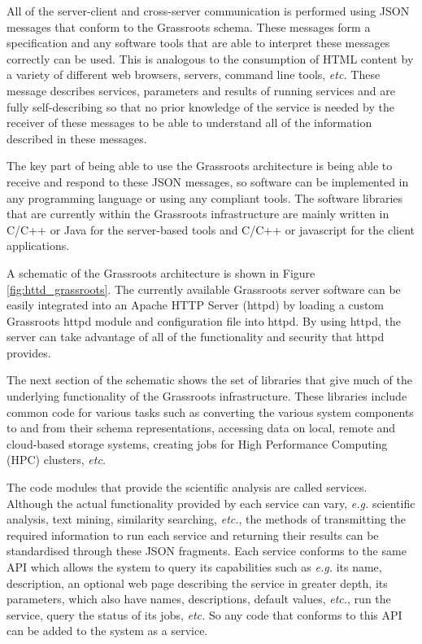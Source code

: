\documentclass[9pt,a4paper]{extarticle}
\begin{document}
All of the server-client and cross-server communication is performed using JSON\cite{JSON} messages that conform to the Grassroots schema. 
These messages form a specification and any software tools that are able to interpret these messages correctly can be used. 
This is analogous to the consumption of HTML content by a variety of different web browsers, servers, command line tools, \textit{etc.} 
These message describes services, parameters and results of running services and are fully self-describing so that no prior knowledge of the service is needed by the receiver of these messages to be able to understand all of the information described in these messages. 

The key part of being able to use the Grassroots architecture is being able to receive and respond to these JSON messages, so software can be implemented in any programming language or using any compliant tools.
The software libraries that are currently within the Grassroots infrastructure are mainly written in C/C++ or Java for the server-based tools and C/C++ or javascript for the client applications.

A schematic of the Grassroots architecture is shown in Figure \ref{fig:httd_grassroots}. The currently available Grassroots server software can be easily integrated into an Apache HTTP Server (httpd)\cite{httpd} by loading a custom Grassroots httpd module and configuration file into httpd. By using httpd, the server can take advantage of all of the functionality and security that httpd provides.  

The next section of the schematic shows the set of libraries that give much of the underlying functionality of the Grassroots infrastructure. These libraries include common code for various tasks such as converting the various system components to and from their schema representations, accessing data on local, remote and cloud-based storage systems, creating jobs for High Performance Computing (HPC) clusters, \textit{etc.}

The code modules that provide the scientific analysis are called services.
Although the actual functionality provided by each service can vary, \textit{e.g.} scientific analysis, text mining, similarity searching, \textit{etc.}, the methods of transmitting the required information to run each service and returning their results can be standardised through these JSON fragments. 
Each service conforms to the same API which allows the system to query its capabilities such as \textit{e.g.} its name, description, an optional web page describing the service in greater depth, its parameters, which also have names, descriptions, default values, \textit{etc.}, run the service, query the status of its jobs, \textit{etc.} 
So any code that conforms to this API can be added to the system as a service.
\end{document}
